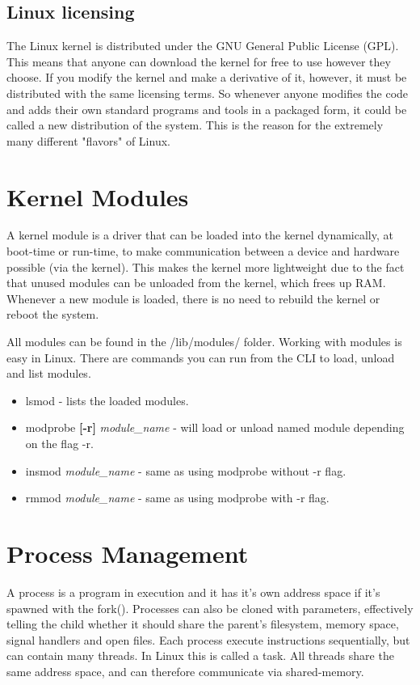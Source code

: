 \documentclass[12pt]{article}
\begin{document}
\subsection{Linux licensing}
The Linux kernel is distributed under the GNU General Public License (GPL). 
This means that anyone can download the kernel for free to use however they choose.
If you modify the kernel and make a derivative of it, however, it must be distributed with the same licensing terms.
So whenever anyone modifies the code and adds their own standard programs and tools in a packaged form, it could be called a new distribution of the system.
This is the reason for the extremely many different "flavors" of Linux.

\section{Kernel Modules} %
A kernel module is a driver that can be loaded into the kernel dynamically, at boot-time or run-time,
to make communication between a device and hardware possible (via the kernel).
This makes the kernel more lightweight due to the fact that unused modules can be unloaded from the kernel, which frees up RAM.
Whenever a new module is loaded, there is no need to rebuild the kernel or reboot the system.

All modules can be found in the /lib/modules/ folder.
Working with modules is easy in Linux. There are commands you can run from the CLI to load, unload and list modules.
\begin{itemize}
  \item lsmod - lists the loaded modules.
  \item modprobe \textbf{[-r]} \textit{module\_name} - will load or unload named module depending on the flag -r.
  \item insmod \textit{module\_name} - same as using modprobe without -r flag.
  \item rmmod \textit{module\_name} - same as using modprobe with -r flag.
\end{itemize}
\newpage
\section{Process Management} 
A process is a program in execution and it has it's own address space if it's spawned with the fork().
Processes can also be cloned with parameters, effectively telling the child whether it should share the parent's filesystem, memory space, signal handlers and open files.
Each process execute instructions sequentially, but can contain many threads. In Linux this is called a task. 
All threads share the same address space, and can therefore communicate via shared-memory.
\end{document}
